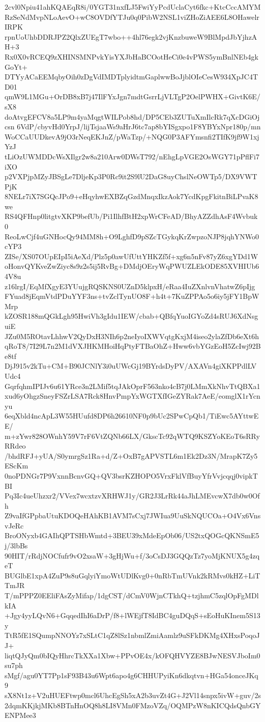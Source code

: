 2cvl0Npiu41ahKQAEqR8i/0YGT31nxfLJ5FwiYyPcdUclaCyt6fkc+KtcCccAMYM
RzSeNdMvpNLoAevO+wC8OVDfYTJu0q0PibW2NSL1viZHoZiAEE6L8OHawelrIRPK
rpnUoUhbDDRJPZ2QlxZUEgT7wbo++4hl76egk2vjKnzbuweW9BlMpdJbYjhzAH+3
Rx0X0vRCEQ9zXHINSMNPvkYisYXJbHaBCOotHeCi0e4vPWS5ymBnlNEb4gkGoYt+
DTYyACaEEMqbyOih0zDgVdIMDTplyidtmGaplwwBoJjblOIeCesW934XpJC4TD01
qmW9L1MGu+OrDB8xB7j47IlFYxJgn7mdtGsrrLjVLTgP2OelPWHX+GivtK6E/sX8
doAtvgEFCV8a5LP9m4yaMqgtWILPob8hd/DP5CEb3ZUTuXmIlcRk7qXcDGiOjcsn
6VdP/cbyvHd0YrpJ/lijTsjaaWs9aHrJ6tc7ap8bYISgxpo1F8YBYxNpr180p/mn
WoCCaUUDkevA9jO3rNeqEKJnZ/pWaTzp/+NQG0P3AFYmsnfi2TIfK9jf9W1xjYzJ
tLiOzUWMDDcWsXIlgr2w8a210Arw0DWsT792/nEhgLpVGE2OsWGY71pPflFi7iXO
p2VXPjpMZyJBSgLe7DljeKp3P0Rc9it2S9lU2DaG8uyChslNeOWTp5/DX9VWTPjK
8NELr7iX7SGQcJPo9+eHqyhwEXBZqGzdMnqxIkzAok7YcdKpgFkitnBiLPvaK8we
RS4QFHnp0litgtvXKP9befUb/Pi1IlhfBtH2xpWrCFeAD/BhyAZZdhAsF4Wvbuk0
ReoLwCjf4uGNHocQy94MM8h+O9LghfD9pSZcTGykqKrZwpzoNJP8jqhYNWo0cYP3
ZISe/XS07OUpEIpI5iAeXd/Plz5p0awUfUttYHKZf5f+xg6n5nFv87yZ6xgYDd1W
oHonvQYKveZwZiyc8s9z2s5ij5RvBg+DMdjOEryWqPWUZLEkODE85XVHIUb64V8u
z16lrgI/EqMfXgyE3YUujgRQSKNS0UZnD5klpxH/eRaa4IuZXnlvnVhatwZ6pIjg
FYuad8jEqmVtdPDuYYF3ns+tvZclTynUO8F+h4t+7KuZPPAo5o6iy5jFY1BpWMrp
kZOSR188mQGkLgh95HwiVh3gIdu1IEW/cbab+QBfqYuoIGYoZd4sRUJ6XdNsguiE
JZu0M5ROtavLhhwV2QyDxH3NIh6p2neIyoIXWVqtgKxjM4iseo2ylaZfDb6eXt6h
qRoT8/7I29L7n2M1dVXJHKMHoiHqPtyFTBaOhZ+Hww6vbYGzEoH5ZcIwj92Be8tf
DjJ915v2kTu+CM+B90JCNlY3i0uUWcGj19BYrdsDyPV/AXAVn4giXKPPdlLVUdc4
GqrfqhmIPIJv6u61YRce3n2LMif5tqJAkOprF563nko4cB7j0LMmXkNhvTtQBXa1
xud6yOhgzSneyFSZrLSA7Rck8HnvPmpYxWGTXfIGeZYRak7AeE/eomglX1rYcnyu
6eqXbld4ncApL3W55HUufd8DP6h26610NF0p9bUc2SPwCpQb1/TiEwc5AYttwEE/
m+zYwr828OWnhY59V7rF6VtZQNb66LX/GkscTc92qWTQ9KSZYoKEoT6sRRyRRdeo
/bhdRFJ+yUA/S0ymrgSz1Ra+d/Z+OxB7gAPVSTL6m1Ek2Dz3N/MrapK7Zy5EScKm
0noPDNGr7P9VxnnBcnvGQ+QV3bsrKZHOPO5VrxFklVfBuyYfrVvjcqqj0vipkTBI
Pq3Ic4ueUhzxr2/VVex7wcxtzvXRHWJ1y/GR2J3LrRk44aJhLMEvcwX7db0w0Ofh
Z9vaIfGPpbaUtuKDOQeHAhKB1AVM7sCxj7JWIua9UuSkNQUCOa+O4Vx6VnsvJeRc
BroONyxb4GAIhQPTSHbWmtd+3BEU39xMdeEpOb06/US2txQOGcQKNSmE5j/3lbBs
90HIT/rRdjNOCfufr9vO2xsaW+3gHjWu+f/3oCsDJ3GQQzTz7yoMjKNUX5g4zqeT
BUGlbE1xpA4ZuP9s8uGqlyiYmoWtUDlKvg0+0nRbTmUVnk2kRMvs0kHZ+LiTTmJR
T/mPPPZ0EEliFAsZyMifap/1dgCST/dCmV0WjnCTkhQ+tzjhmC5zqlOpFgMDlkIA
+Jgy4yyLQvN6+GqqedIhI6aDrP/f8+lWEjfT8IdBC4guDQqS+sEoHuKInem5S13y
TtR5fE1SQumpNNOYz7xSLtC1qZ8lSz1nbmlZmiAamlz9uSFkDKMg4XHxsPoqoJJ+
liqtQJyQm0bIQyHhrcTkXXa1Xbw+PPvOE4x/kOFQHVYZE8BJwNESVJboIm0su7ph
sMgf/agu0YT7Pp1sF93B43u6Wpt6apo4g6CHHUPyiKn6dkqtvn+HGa54onceJKq9
sX8Nt1z+V2uHUEFtwp0mcl6UhcEgSh5xA2b3uvZt4G+J2Vl14snpx5ivW+guv/2s
2dqmKKjkjMKb8BTnHnOQ8h8LI8VMn0FMzoVZq/OQMPzW8nKICQdsQnbGYENPMee3

